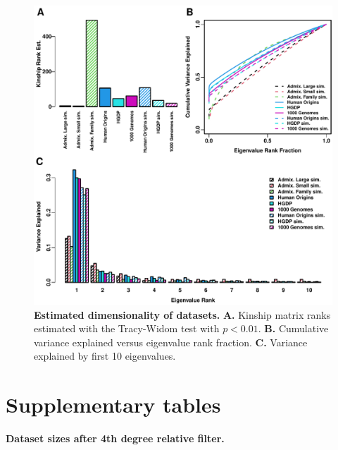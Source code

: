 \documentclass[11pt]{article}
\begin{document}
\begin{figure}[hp!]
  \centering
  \includegraphics[width=\textwidth]{eigen.pdf}
  \caption{
    {\bf Estimated dimensionality of datasets.}
    \textbf{A.}
    Kinship matrix ranks estimated with the Tracy-Widom test with $p < 0.01$.
    \textbf{B.}
    Cumulative variance explained versus eigenvalue rank fraction.
    \textbf{C.}
    Variance explained by first 10 eigenvalues.
  }
  \label{fig:eigen}
\end{figure}

\clearpage

\section{Supplementary tables}

\begin{table}[hb!]
  \centering
  \footnotesize
  \caption{
    \textbf{Dataset sizes after 4th degree relative filter.}
  }
  \label{tab:king_cutoff}
\end{table}
\end{document}
